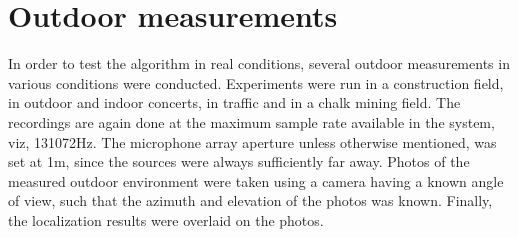 \section{Outdoor measurements}
In order to test the algorithm in real conditions, several outdoor measurements in various conditions were conducted. Experiments were run in a construction field, in outdoor and indoor concerts, in traffic and in a chalk mining field. The recordings are again done at the maximum sample rate available in the system, viz, 131072Hz. The microphone array aperture unless otherwise mentioned, was set at 1m, since the sources were always sufficiently far away. Photos of the measured outdoor environment were taken using a camera having a known angle of view, such that the azimuth and elevation of the photos was known. Finally, the localization results were overlaid on the photos.
